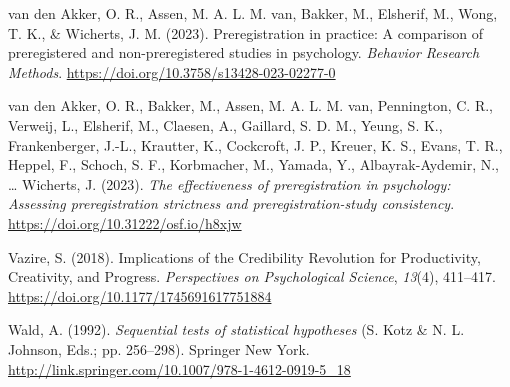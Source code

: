\documentclass[
  man]{apa7}
\newlength{\cslhangindent}
\newenvironment{CSLReferences}[2] %
 {\begin{list}{}{%
  \setlength{\itemindent}{0pt}
  \setlength{\leftmargin}{0pt}
  \setlength{\parsep}{0pt}
  \ifodd #1
   \setlength{\leftmargin}{\cslhangindent}
   \setlength{\itemindent}{-1\cslhangindent}
  \fi
  \setlength{\itemsep}{#2\baselineskip}}}
 {\end{list}}
\begin{document}
\begin{CSLReferences}{1}{0}
van den Akker, O. R., Assen, M. A. L. M. van, Bakker, M., Elsherif, M., Wong, T. K., \& Wicherts, J. M. (2023). Preregistration in practice: A comparison of preregistered and non-preregistered studies in psychology. \emph{Behavior Research Methods}. \url{https://doi.org/10.3758/s13428-023-02277-0}

van den Akker, O. R., Bakker, M., Assen, M. A. L. M. van, Pennington, C. R., Verweij, L., Elsherif, M., Claesen, A., Gaillard, S. D. M., Yeung, S. K., Frankenberger, J.-L., Krautter, K., Cockcroft, J. P., Kreuer, K. S., Evans, T. R., Heppel, F., Schoch, S. F., Korbmacher, M., Yamada, Y., Albayrak-Aydemir, N., \ldots{} Wicherts, J. (2023). \emph{The effectiveness of preregistration in psychology: Assessing preregistration strictness and preregistration-study consistency}. \url{https://doi.org/10.31222/osf.io/h8xjw}

Vazire, S. (2018). Implications of the Credibility Revolution for Productivity, Creativity, and Progress. \emph{Perspectives on Psychological Science}, \emph{13}(4), 411--417. \url{https://doi.org/10.1177/1745691617751884}

Wald, A. (1992). \emph{Sequential tests of statistical hypotheses} (S. Kotz \& N. L. Johnson, Eds.; pp. 256--298). Springer New York. \url{http://link.springer.com/10.1007/978-1-4612-0919-5_18}

\end{CSLReferences}

\endgroup
\end{document}
